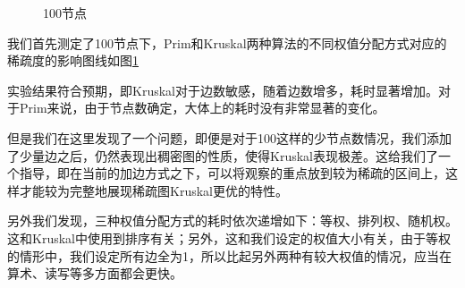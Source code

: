 \documentclass[UTF8]{ctexart}
\begin{document}
\begin{figure}[htbp]
    \caption{100节点}
    \label{fig:100a}
\end{figure}

我们首先测定了100节点下，Prim和Kruskal两种算法的不同权值分配方式对应的稀疏度的影响图线如图\ref{fig:100a}

实验结果符合预期，即Kruskal对于边数敏感，随着边数增多，耗时显著增加。对于Prim来说，由于节点数确定，大体上的耗时没有非常显著的变化。

但是我们在这里发现了一个问题，即便是对于100这样的少节点数情况，我们添加了少量边之后，仍然表现出稠密图的性质，使得Kruskal表现极差。这给我们了一个指导，即在当前的加边方式之下，可以将观察的重点放到较为稀疏的区间上，这样才能较为完整地展现稀疏图Kruskal更优的特性。

另外我们发现，三种权值分配方式的耗时依次递增如下：等权、排列权、随机权。这和Kruskal中使用到排序有关；另外，这和我们设定的权值大小有关，由于等权的情形中，我们设定所有边全为1，所以比起另外两种有较大权值的情况，应当在算术、读写等多方面都会更快。
\end{document}

